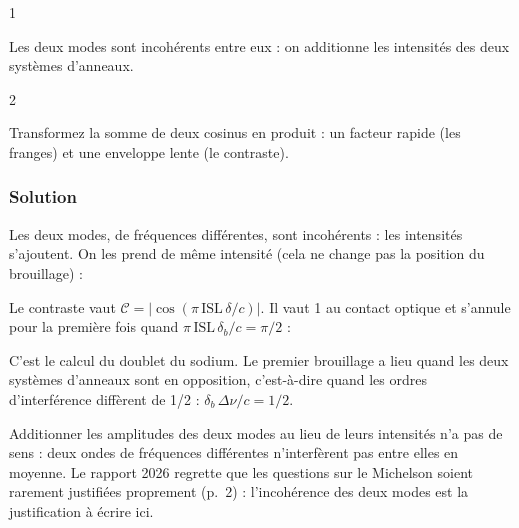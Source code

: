 \documentclass[11pt,a4paper]{article}
\newcommand{\equationajustee}[1]{%
  \sbox{\boiteequation}{$\displaystyle #1$}%
  \ifdim\wd\boiteequation>\linewidth
    \[\resizebox{\linewidth}{!}{\usebox{\boiteequation}}\]%
  \else
    \[#1\]%
  \fi}
\begin{document}
\begin{indication}{1}

Les deux modes sont incohérents entre eux : on additionne les intensités des deux systèmes d'anneaux.

\end{indication}

\begin{indication}{2}

Transformez la somme de deux cosinus en produit : un facteur rapide (les franges) et une enveloppe lente (le contraste).

\end{indication}

\hypertarget{solution-17}{%
\subsubsection{Solution}\label{solution-17}}

Les deux modes, de fréquences différentes, sont incohérents : les intensités s'ajoutent. On les prend de même intensité (cela ne change pas la position du brouillage) :

\equationajustee{\begin{aligned}
I(\delta)&=2I_0\left[2+\cos\frac{2\pi\nu_1\delta}c+\cos\frac{2\pi\nu_2\delta}c\right]\\
&=4I_0\left[1+\cos\frac{\pi\,\mathrm{ISL}\,\delta}c\cos\frac{\pi(\nu_1+\nu_2)\delta}c\right]
\end{aligned}}

Le contraste vaut \(\mathcal C=\left|\cos(\pi\,\mathrm{ISL}\,\delta/c)\right|\). Il vaut 1 au contact optique et s'annule pour la première fois quand \(\pi\,\mathrm{ISL}\,\delta_b/c=\pi/2\) :

\equationajustee{\boxed{\delta_b=\frac c{2\,\mathrm{ISL}}}}

\begin{methode}

C'est le calcul du doublet du sodium. Le premier brouillage a lieu quand les deux systèmes d'anneaux sont en opposition, c'est-à-dire quand les ordres d'interférence diffèrent de 1/2 : \(\delta_b\,\Delta\nu/c=1/2\).

\end{methode}

\begin{piege}

Additionner les amplitudes des deux modes au lieu de leurs intensités n'a pas de sens : deux ondes de fréquences différentes n'interfèrent pas entre elles en moyenne. Le rapport 2026 regrette que les questions sur le Michelson soient rarement justifiées proprement (p.~2) : l'incohérence des deux modes est la justification à écrire ici.

\end{piege}
\end{document}
